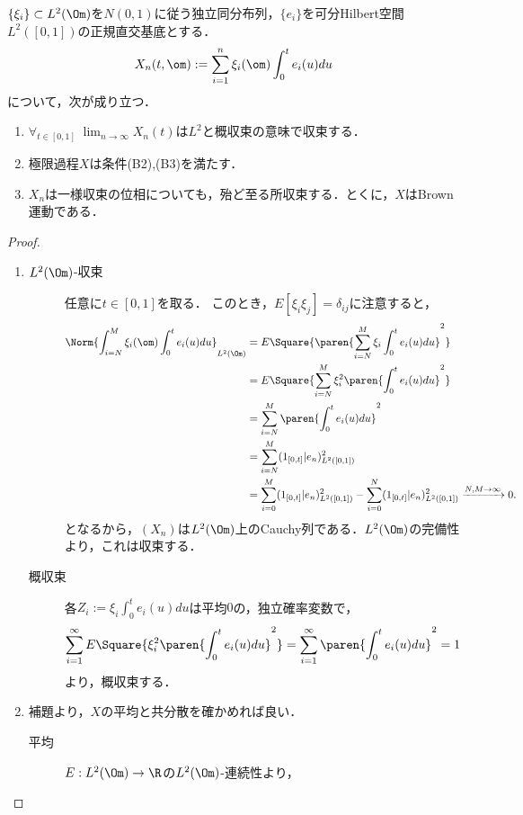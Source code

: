 \documentclass[uplatex,dvipdfmx]{jsreport}
\begin{document}
\begin{proposition}
    $\{\xi_i\}\subset L^2(\Om)$を$N(0,1)$に従う独立同分布列，$\{e_i\}$を可分Hilbert空間$L^2([0,1])$の正規直交基底とする．
    \[X_n(t,\om):=\sum_{i=1}^n\xi_i(\om)\int^t_0e_i(u)du\]
    について，次が成り立つ．
    \begin{enumerate}
        \item $\forall_{t\in[0,1]}\;\lim_{n\to\infty}X_n(t)$は$L^2$と概収束の意味で収束する．
        \item 極限過程$X$は条件(B2),(B3)を満たす．
        \item $X_n$は一様収束の位相についても，殆ど至る所収束する．とくに，$X$はBrown運動である．
    \end{enumerate}
\end{proposition}
\begin{proof}\mbox{}
    \begin{enumerate}
        \item \begin{description}
            \item[$L^2(\Om)$-収束] 任意に$t\in[0,1]$を取る．
            このとき，$E[\xi_i\xi_j]=\delta_{ij}$に注意すると，
            \begin{align*}
                \Norm{\int^M_{i=N}\xi_i(\om)\int^t_0e_i(u)du}_{L^2(\Om)}&=E\Square{\paren{\sum_{i=N}^M\xi_i\int^t_0e_i(u)du}^2}\\
                &=E\Square{\sum_{i=N}^M\xi_i^2\paren{\int^t_0e_i(u)du}^2}\\
                &=\sum_{i=N}^M\paren{\int^t_0e_i(u)du}^2\\
                &=\sum_{i=N}^M(1_{[0,t]}|e_n)^2_{L^2([0,1])}\\
                &=\sum^M_{i=0}(1_{[0,t]}|e_n)^2_{L^2([0,1])}-\sum^N_{i=0}(1_{[0,t]}|e_n)^2_{L^2([0,1])}\xrightarrow{N,M\to\infty}0.
            \end{align*}
            となるから，$(X_n)$は$L^2(\Om)$上のCauchy列である．$L^2(\Om)$の完備性より，これは収束する．
            \item[概収束] 各$Z_i:=\xi_i\int^t_0e_i(u)du$は平均$0$の，独立確率変数で，
            \[\sum_{i=1}^\infty E\Square{\xi^2_i\paren{\int^t_0e_i(u)du}^2}=\sum_{i=1}^\infty\paren{\int^t_0e_i(u)du}^2=1\]
            より，概収束する．
        \end{description}
        \item 補題より，$X$の平均と共分散を確かめれば良い．
        \begin{description}
            \item[平均] $E:L^2(\Om)\to\R$の$L^2(\Om)$-連続性より，

\end{description}
\end{enumerate}
\end{proof}
\end{document}
